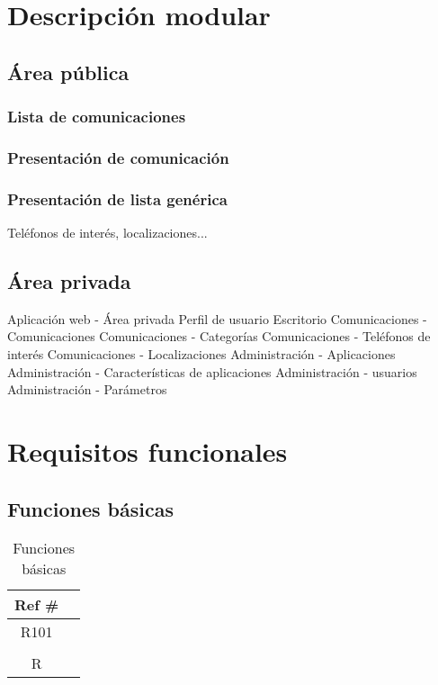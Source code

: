 \section{Descripción modular}

\subsection{Área pública}

\subsubsection{Lista de comunicaciones}
\subsubsection{Presentación de comunicación}
\subsubsection{Presentación de lista genérica}
Teléfonos de interés, localizaciones...

\subsection{Área privada}
Aplicación web - Área privada
Perfil de usuario
Escritorio
Comunicaciones - Comunicaciones
Comunicaciones - Categorías
Comunicaciones - Teléfonos de interés
Comunicaciones - Localizaciones
Administración - Aplicaciones
Administración - Características de aplicaciones
Administración - usuarios
Administración - Parámetros

\section{Requisitos funcionales}

\subsection{Funciones básicas}
\begin{table}[ht]
    \centering
    \begin{tabularx}{\textwidth}{|cX|}
    \rowcolor[HTML]{9B9B9B} 
    {\color[HTML]{FFFFFF} Ref \#} &
      \multicolumn{1}{l}{\cellcolor[HTML]{9B9B9B}{\color[HTML]{FFFFFF} Función}} \\ \hline
    R101\label{R101} &  \\
         &  \\
    R    &  \\ \hline
    \end{tabularx}
    \caption{Funciones básicas}
    \label{cuadro:funciones-basicas }
\end{table}

